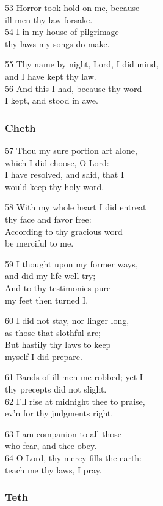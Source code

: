 53 Horror took hold on me, because\\
ill men thy law forsake.\\
54 I in my house of pilgrimage\\
thy laws my songs do make.

55 Thy name by night, Lord, I did mind,\\
and I have kept thy law.\\
56 And this I had, because thy word\\
I kept, and stood in awe.

\subsubsection*{Cheth}

57 Thou my sure portion art alone,\\
which I did choose, O Lord:\\
I have resolved, and said, that I\\
would keep thy holy word.

58 With my whole heart I did entreat\\
thy face and favor free:\\
According to thy gracious word\\
be merciful to me.

59 I thought upon my former ways,\\
and did my life well try;\\
And to thy testimonies pure\\
my feet then turned I.

60 I did not stay, nor linger long,\\
as those that slothful are;\\
But hastily thy laws to keep\\
myself I did prepare.

61 Bands of ill men me robbed; yet I\\
thy precepts did not slight.\\
62 I’ll rise at midnight thee to praise,\\
ev’n for thy judgments right.

63 I am companion to all those\\
who fear, and thee obey.\\
64 O Lord, thy mercy fills the earth:\\
teach me thy laws, I pray.

\subsubsection*{Teth}

